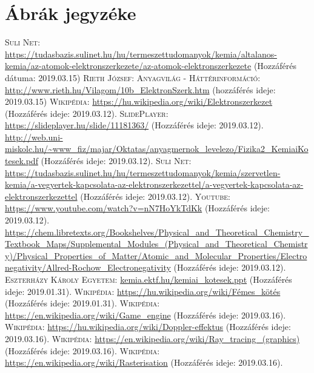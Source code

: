 \documentclass[colorlinks]{thesis-ekf}
\theoremstyle{definition}
\theoremstyle{remark}
\begin{document}
\chapter{Ábrák jegyzéke}
\begin{thebibliography}{1}
	 \textsc{Suli Net}: \url{https://tudasbazis.sulinet.hu/hu/termeszettudomanyok/kemia/altalanos-kemia/az-atomok-elektronszerkezete/az-atomok-elektronszerkezete} (Hozzáférés dátuma: 2019.03.15)
	  \textsc{Rieth József: Anyagvilág - Háttérinformáció}: \url{http://www.rieth.hu/Vilagom/10b_ElektronSzerk.htm} (hozzáférés ideje: 2019.03.15)
	 \textsc{Wikipédia}: \url{https://hu.wikipedia.org/wiki/Elektronszerkezet} (Hozzáférés ideje: 2019.03.12).
	 \textsc{SlidePlayer}: \url{https://slideplayer.hu/slide/11181363/} (Hozzáférés ideje: 2019.03.12).
	 \url{http://web.uni-miskolc.hu/~www_fiz/majar/Oktatas/anyagmernok_levelezo/Fizika2_KemiaiKotesek.pdf} (Hozzáférés ideje: 2019.03.12).
	 \textsc{Suli Net}: \url{https://tudasbazis.sulinet.hu/hu/termeszettudomanyok/kemia/szervetlen-kemia/a-vegyertek-kapcsolata-az-elektronszerkezettel/a-vegyertek-kapcsolata-az-elektronszerkezettel} (Hozzáférés ideje: 2019.03.12).
	 \textsc{Youtube}: \url{https://www.youtube.com/watch?v=nN7HoYkTdKk} (Hozzáférés ideje: 2019.03.12).
	 \url{https://chem.libretexts.org/Bookshelves/Physical_and_Theoretical_Chemistry_Textbook_Maps/Supplemental_Modules_(Physical_and_Theoretical_Chemistry)/Physical_Properties_of_Matter/Atomic_and_Molecular_Properties/Electronegativity/Allred-Rochow_Electronegativity} (Hozzáférés ideje: 2019.03.12).
	 \textsc{Eszterházy Károly Egyetem}: \url{kemia.ektf.hu/kemiai_kotesek.ppt} (Hozzáférés ideje: 2019.01.31).
	 \textsc{Wikipédia}: \url{https://hu.wikipedia.org/wiki/Fémes_kötés} (Hozzáférés ideje: 2019.01.31).
	 \textsc{Wikipédia}: \url{https://en.wikipedia.org/wiki/Game_engine} (Hozzáférés ideje: 2019.03.16).
	 \textsc{Wikipédia}: \url{https://hu.wikipedia.org/wiki/Doppler-effektus} (Hozzáférés ideje: 2019.03.16).
	 \textsc{Wikipédia}: \url{https://en.wikipedia.org/wiki/Ray_tracing_(graphics)} (Hozzáférés ideje: 2019.03.16).
	 \textsc{Wikipédia}: \url{https://en.wikipedia.org/wiki/Rasterisation} (Hozzáférés ideje: 2019.03.16).
\end{thebibliography}
\end{document}
